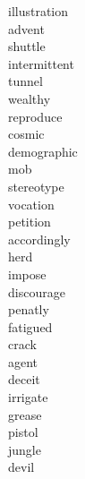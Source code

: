 \documentclass[a4paper, 10pt]{ctexart}
\begin{document}
\begin{multicols*}{2}
\begin{description}
\item[illustration]

\item[advent]

\item[shuttle]

\item[intermittent]

\item[tunnel]

\item[wealthy]

\item[reproduce]

\item[cosmic]

\item[demographic]

\item[mob]

\item[stereotype]

\item[vocation]

\item[petition]

\item[accordingly]

\item[herd]

\item[impose]

\item[discourage]

\item[penatly]

\item[fatigued]

\item[crack]

\item[agent]

\item[deceit]

\item[irrigate]

\item[grease]

\item[pistol]

\item[jungle]

\item[devil]


\end{description}
\end{multicols*}
\end{document}
